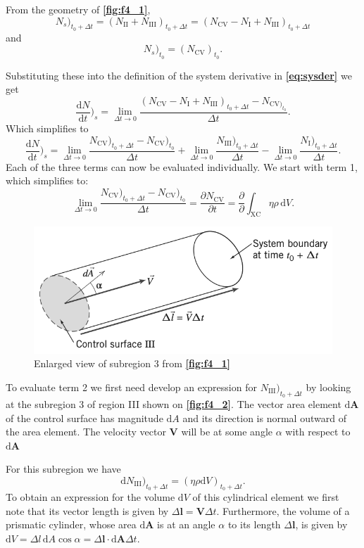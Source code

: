 From the geometry of \textbf{\autoref{fig:f4_1}},
\[ 
N_s)_{t_0 + \Delta t} = \left( N_{\mathrm{II}} + N_{\mathrm{III}} \right)_{t_0 + \Delta t} = \left( N_{\mathrm{CV}} - N_{\mathrm{I}} + N_{\mathrm{III}} \right)_{t_0 + \Delta t}
\]
and
\[ 
N_s )_{t_0} = \left( N_{\mathrm{CV}} \right)_{t_0}
.\]

Substituting these into the definition of the system derivative in \textbf{\autoref{eq:sysder}} we get
\[ 
\frac{\mathrm{d}N}{\mathrm{d}t} \bigg)_{s} = \lim_{\Delta t \to 0} \frac{\left( N_{\mathrm{CV}} - N_{\mathrm{I}} + N_{\mathrm{III}} \right)_{t_0 + \Delta t} - N_{\mathrm{CV} )_{t_0}}}{\Delta t}
.\]
Which simplifies to
\[ 
  \frac{\mathrm{d}N}{\mathrm{d}t} \bigg)_s = \lim_{\Delta t \to 0} \frac{N_{\mathrm{CV}})_{t_0 + \Delta t} - N_{\mathrm{CV}})_{t_0}}{\Delta t} + \lim_{\Delta t \to 0} \frac{N_{\mathrm{III}})_{t_0 + \Delta t}}{\Delta t} - \lim_{\Delta t \to 0} \frac{N_{\mathrm{I}} )_{t_0 + \Delta t}}{\Delta t}
.\]
Each of the three terms can now be evaluated individually. We start with term 1, which simplifies to:
\[ 
\lim_{\Delta t \to 0} \frac{N_{\mathrm{CV}} )_{t_0 + \Delta t} - N_{\mathrm{CV}})_{t_0}}{\Delta t} = \frac{\partial N_{\mathrm{CV}}}{\partial t} = \frac{\partial }{\partial } \int_{\mathrm{XC}} \eta \rho \, \mathrm{d}V 
.\]

\begin{figure} [ht]
  \centering
  \includegraphics[width=0.5\linewidth]{./figures/f4_2.png}
  \caption{Enlarged view of subregion 3 from \textbf{\autoref{fig:f4_1}}}
  \label{fig:f4_2}
\end{figure}

To evaluate term 2 we first need develop an expression for $N_{\mathrm{III}})_{t_0 + \Delta t}$ by looking at the subregion 3 of region III shown on \textbf{\autoref{fig:f4_2}}. The vector area element $\mathrm{d}\textbf{A}$ of the control surface has magnitude $\mathrm{d}A$ and its direction is normal outward of the area element. The velocity vector $\textbf{V}$ will be at some angle $\alpha$ with respect to $\mathrm{d}\textbf{A}$

For this subregion we have
\[ 
\mathrm{d}N_{\mathrm{III}} )_{t_0 + \Delta t} = \left( \eta \rho \mathrm{d}V \right)_{t_0 + \Delta t}
.\]
To obtain an expression for the volume $\mathrm{d}V$ of this cylindrical element we first note that its vector length is given by $\Delta \textbf{l} = \textbf{V} \Delta t$. Furthermore, the volume of a prismatic cylinder, whose area $\mathrm{d}\textbf{A}$ is at an angle $\alpha$ to its length $\Delta \textbf{l}$, is given by $\mathrm{d}V = \Delta l \, \mathrm{d}A \cos \alpha = \Delta \textbf{l} \cdot \mathrm{d}\textbf{A} \Delta t$.

